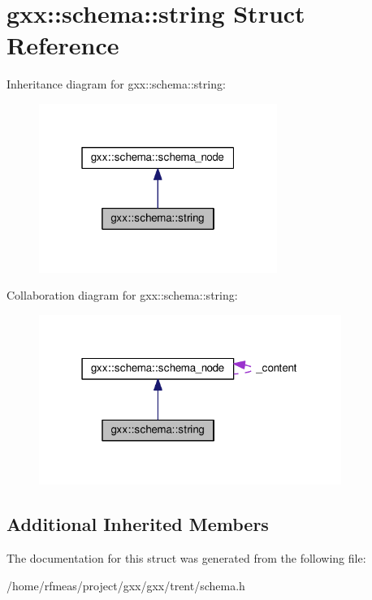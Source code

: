 \hypertarget{structgxx_1_1schema_1_1string}{}\section{gxx\+:\+:schema\+:\+:string Struct Reference}
\label{structgxx_1_1schema_1_1string}


Inheritance diagram for gxx\+:\+:schema\+:\+:string\+:
\nopagebreak
\begin{figure}[H]
\begin{center}
\leavevmode
\includegraphics[width=220pt]{structgxx_1_1schema_1_1string__inherit__graph}
\end{center}
\end{figure}


Collaboration diagram for gxx\+:\+:schema\+:\+:string\+:
\nopagebreak
\begin{figure}[H]
\begin{center}
\leavevmode
\includegraphics[width=279pt]{structgxx_1_1schema_1_1string__coll__graph}
\end{center}
\end{figure}
\subsection*{Additional Inherited Members}


The documentation for this struct was generated from the following file\+:\begin{DoxyCompactItemize}
\item 
/home/rfmeas/project/gxx/gxx/trent/schema.\+h\end{DoxyCompactItemize}
